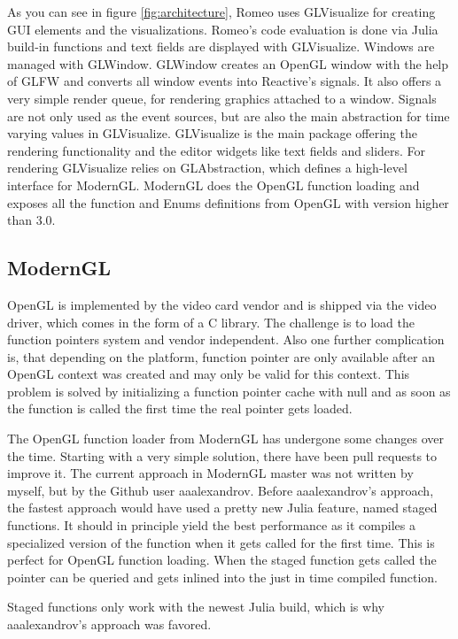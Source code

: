 As you can see in figure \ref{fig:architecture}, Romeo uses GLVisualize for creating \ac{GUI} elements and the visualizations. Romeo's code evaluation is done via Julia build-in functions and text fields are displayed with GLVisualize.
Windows are managed with GLWindow. 
GLWindow creates an OpenGL window with the help of GLFW and converts all window events into Reactive's signals. 
It also offers a very simple render queue, for rendering graphics attached to a window.
Signals are not only used as the event sources, but are also the main abstraction for time varying values in GLVisualize.
GLVisualize is the main package offering the rendering functionality and the editor widgets like text fields and sliders.
For rendering GLVisualize relies on GLAbstraction, which defines a high-level interface for ModernGL.
ModernGL does the \ac{OpenGL} function loading and exposes all the function and Enums definitions from \ac{OpenGL} with version higher than 3.0.



\subsection{ModernGL}
\ac{OpenGL} is implemented by the video card vendor and is shipped via the video driver, which comes in the form of a C library.
The challenge is to load the function pointers system and vendor independent. 
Also one further complication is, that depending on the platform, 
function pointer are only available after an \ac{OpenGL} context was created and may only be valid for this context. \cite{wgl}
This problem is solved by initializing a function pointer cache with null and as soon as the function is called the first time the real pointer gets loaded.

The OpenGL function loader from ModernGL has undergone some changes over the time.
Starting with a very simple solution, there have been pull requests to improve it.
The current approach in ModernGL master was not written by myself, but by the Github user aaalexandrov.
Before aaalexandrov’s approach, the fastest approach would have used a pretty new Julia feature, named staged functions.
It should in principle yield the best performance as it compiles a specialized version of the function when it gets called for the first time. This is perfect for \ac{OpenGL} function loading. When the staged function gets called the pointer can be queried and gets inlined into the just in time compiled function.

Staged functions only work with the newest Julia build, which is why aaalexandrov’s approach was favored.


